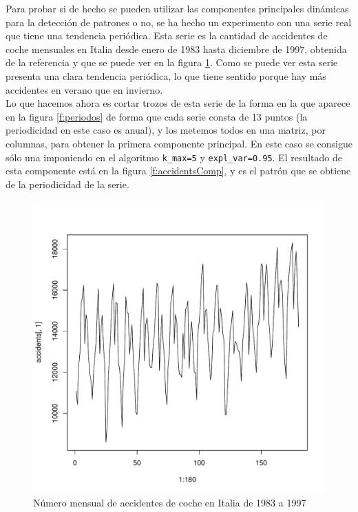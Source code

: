 Para probar si de hecho se pueden utilizar las componentes principales dinámicas para la detección de patrones o no, se ha hecho un experimento con una serie real que tiene una tendencia periódica. Esta serie es la cantidad de accidentes de coche mensuales en Italia desde enero de 1983 hasta diciembre de 1997, obtenida de la referencia \cite{timeS} y que se puede ver en la figura \ref{f:accidents}. Como se puede ver esta serie presenta una clara tendencia periódica, lo que tiene sentido porque hay más accidentes en verano que en invierno.\\

Lo que hacemos ahora es cortar trozos de esta serie de la forma en la que aparece en la figura \ref{f:periodos} de forma que cada serie consta de 13 puntos (la periodicidad en este caso es anual), y los metemos todos en una matriz, por columnas, para obtener la primera componente principal. En este caso se consigue sólo una imponiendo en el algoritmo \texttt{k\_max=5} y \texttt{expl\_var=0.95}. El resultado de esta componente está en la figura \ref{f:accidentsComp}, y es el patrón que se obtiene de la periodicidad de la serie.\\

\begin{figure}[]
 \includegraphics[width=\textwidth, height=0.4\textheight]{../imagenes/accidents.pdf}
 \caption{Número mensual de accidentes de coche en Italia de 1983 a 1997}
 \label{f:accidents}
\end{figure}

